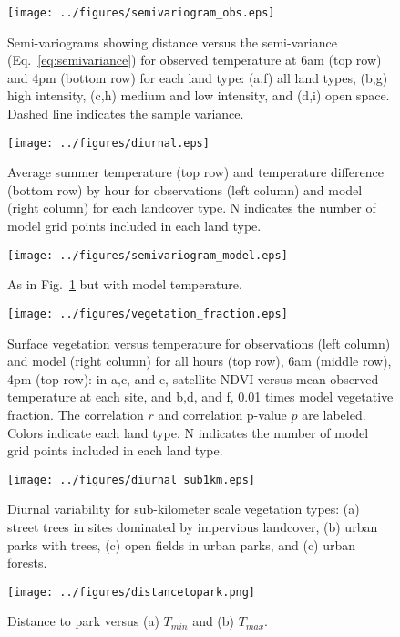 \documentclass[draft,linenumbers]{agujournal}
\begin{document}
\begin{figure}[h]
\centering
\texttt{[image: ../figures/semivariogram\_obs.eps]}
\caption{Semi-variograms showing distance versus the semi-variance (Eq.~\ref{eq:semivariance}) for observed temperature at 6am (top row) and 4pm (bottom row) for each land type: (a,f) all land types, (b,g) high intensity, (c,h) medium and low intensity, and (d,i) open space. Dashed line indicates the sample variance. 
}\label{fig:semiv_obs}

\end{figure}

\begin{figure}[h]
\centering
\texttt{[image: ../figures/diurnal.eps]}
\caption{Average summer temperature (top row) and temperature difference (bottom row) by hour for observations (left column) and model (right column) for each landcover type. N indicates the number of model grid points included in each land type. }
\label{fig:diurnal}
\end{figure}


\begin{figure}[h]
\centering
\texttt{[image: ../figures/semivariogram\_model.eps]}
\caption{As in Fig.~\ref{fig:semiv_obs} but with model temperature.}
\label{fig:semiv_model}
\end{figure}

\begin{figure}[h]
\centering
\texttt{[image: ../figures/vegetation\_fraction.eps]}
\caption{Surface vegetation versus temperature for observations (left column) and model (right column) for all hours (top row), 6am (middle row), 4pm (top row): in a,c, and e, satellite NDVI versus mean observed temperature at each site, and b,d, and f, 0.01 times model vegetative fraction. The correlation $r$ and correlation p-value $p$ are labeled. Colors indicate each land type. N indicates the number of model grid points included in each land type.}
\label{fig:veg}
\end{figure}

\begin{figure}
\centering
\texttt{[image: ../figures/diurnal\_sub1km.eps]}
\caption{Diurnal variability for sub-kilometer scale vegetation types: (a) street trees in sites dominated by impervious landcover, (b) urban parks with trees, (c) open fields in urban parks, and (c) urban forests. }
\label{fig:diurnal_urbanforests_etc}
\end{figure}

\begin{figure}
\centering
\texttt{[image: ../figures/distancetopark.png]}
\caption{Distance to park versus (a) $T_{min}$ and (b) $T_{max}$.}
\label{fig:distance to park}
\end{figure}
\end{document}
